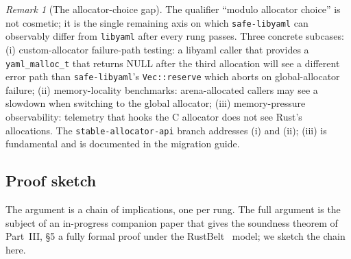 \documentclass[12pt]{article}
\theoremstyle{definition}
\theoremstyle{remark}
\newtheorem{remark}[theorem]{Remark}
\newcommand{\libyaml}{\texttt{libyaml}}
\newcommand{\safelibyaml}{\texttt{safe-libyaml}}
\begin{document}
\begin{remark}[The allocator-choice gap]
\label{rem:alloc}
The qualifier ``modulo allocator choice'' is not cosmetic; it is the
single remaining axis on which \safelibyaml{} can observably differ
from \libyaml{} after every rung passes. Three concrete subcases:
(i) custom-allocator failure-path testing: a libyaml caller that
provides a \texttt{yaml\_malloc\_t} that returns NULL after the third
allocation will see a different error path than \safelibyaml{}'s
\texttt{Vec::reserve} which aborts on global-allocator failure;
(ii) memory-locality benchmarks: arena-allocated callers may see a
slowdown when switching to the global allocator;
(iii) memory-pressure observability: telemetry that hooks the C
allocator does not see Rust's allocations. The
\texttt{stable-allocator-api} branch addresses (i) and (ii); (iii) is
fundamental and is documented in the migration guide.
\end{remark}

\subsection{Proof sketch}

The argument is a chain of implications, one per rung. The full
argument is the subject of an in-progress companion paper that gives
the soundness theorem of Part~III, \S{}5 a fully formal proof under
the RustBelt~\cite{rustbelt} model; we sketch the chain here.
\end{document}
